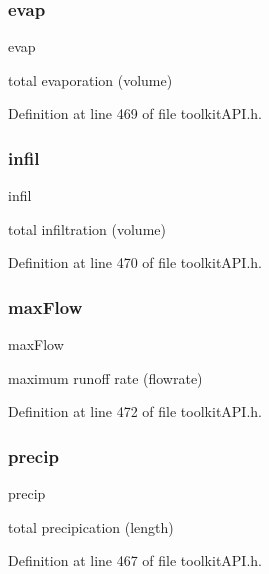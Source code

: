 \subsubsection{\texorpdfstring{evap}{evap}}
{\footnotesize\ttfamily evap}

total evaporation (volume) 

Definition at line 469 of file toolkit\+A\+P\+I.\+h.

\mbox{\label{struct_s_m___subcatch_stats_a6cd5b8d39e713bd1618a254d53def9b2}} 
\subsubsection{\texorpdfstring{infil}{infil}}
{\footnotesize\ttfamily infil}

total infiltration (volume) 

Definition at line 470 of file toolkit\+A\+P\+I.\+h.

\mbox{\label{struct_s_m___subcatch_stats_a4d84bca5454f3903c44fe865e44674f5}} 
\subsubsection{\texorpdfstring{maxFlow}{maxFlow}}
{\footnotesize\ttfamily max\+Flow}

maximum runoff rate (flowrate) 

Definition at line 472 of file toolkit\+A\+P\+I.\+h.

\mbox{\label{struct_s_m___subcatch_stats_a98bbe0990fa7260a158db1f443480e86}} 
\subsubsection{\texorpdfstring{precip}{precip}}
{\footnotesize\ttfamily precip}

total precipication (length) 

Definition at line 467 of file toolkit\+A\+P\+I.\+h.

